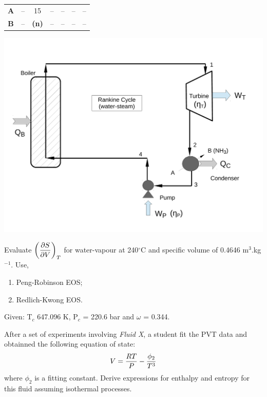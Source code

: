 \begin{MyTutorial}{}
\begin{problem}
\begin{center}
\begin{tabular} {||c | c c c c c c || }
           {\bf A }   & --         & 15             &   --           & --                  & --                      &   --     \\
           {\bf B }   & --         & {\bf (n)}      &   --           & --                  & --                      &   --         \\
            \hline\hline
       \end{tabular}
        \includegraphics[width=.8\columnwidth,clip]{./../Pics/RankineCycle2}
     \end{center}
  \end{problem}
%
  \begin{problem}\label{Chapter:ThermodynamicPropertiesPureFluids:Problem:06} %
      Evaluate $\left(\displaystyle\frac{\partial S}{\partial V}\right)_{T}$ for  water-vapour at 240$^{\circ}$C and specific volume of 0.4646 m$^{3}$.kg$^{-1}$. Use,
          \begin{enumerate}
               \item Peng-Robinson EOS;
               \item Redlich-Kwong EOS.
          \end{enumerate}
     Given: T$_{c}$ 647.096 K, P$_{c}$ = 220.6 bar and $\omega$ = 0.344.
  \end{problem}
%
  \begin{problem}\label{Chapter:ThermodynamicPropertiesPureFluids:Problem:07}\citep{Borgnakke_Book} %
       After a set of experiments involving {\it Fluid X}, a student fit the PVT data and obtainned the following equation of state:
          \begin{displaymath}
             V = \displaystyle\frac{RT}{P} - \displaystyle\frac{\phi_{2}}{T^{3}}
          \end{displaymath}
       where $\phi_{2}$ is a fitting constant. Derive expressions for enthalpy and entropy for this fluid assuming isothermal processes.


\end{problem}
\end{MyTutorial}
